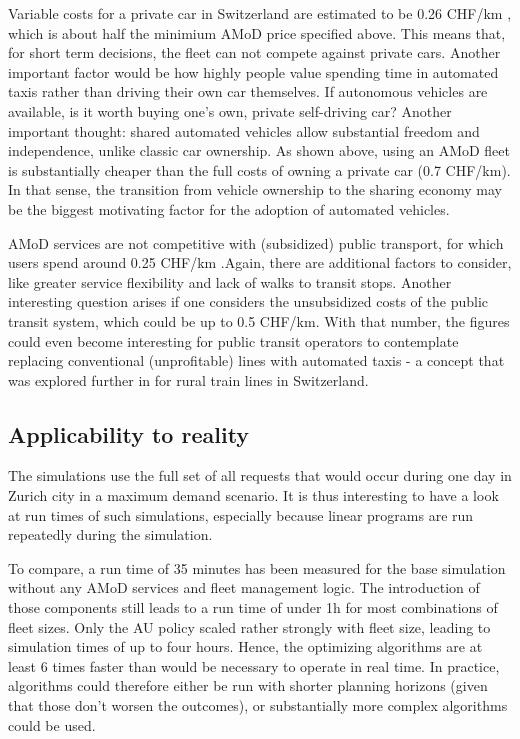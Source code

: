 Variable costs for a private car in Switzerland are estimated to be 0.26 CHF/km \citep{TCS2016}, which is about half the minimium AMoD price specified above. This means that, for short term decisions, the fleet can not compete against private cars. Another important factor would be how highly people value spending time in automated taxis rather than driving their own car themselves. If autonomous vehicles are available, is it worth buying one’s own, private self-driving car? Another important thought: shared automated vehicles allow substantial freedom and independence, unlike classic car ownership. As shown above, using an AMoD fleet is substantially cheaper than the full costs of owning a private car (0.7 CHF/km). In that sense, the transition from vehicle ownership to the sharing economy may be the biggest motivating factor for the adoption of automated vehicles.


AMoD services are not competitive with (subsidized) public transport, for which users spend around 0.25 CHF/km  \citep{Bosch2016a}.Again, there are additional factors to consider, like greater service flexibility and lack of walks to transit stops. Another interesting question arises if one considers the unsubsidized costs of the public transit system, which could be up to 0.5 CHF/km. With that number, the figures could even become interesting for public transit operators to contemplate replacing conventional (unprofitable) lines with automated taxis - a concept that was explored further in  \cite{trainPaper} for rural train lines in Switzerland.

\subsection{Applicability to reality} 

The simulations use the full set of all requests that would occur during one day in Zurich city in a maximum demand scenario. It is thus interesting to have a look at run times of such simulations, especially because linear programs are run repeatedly during the simulation.


To compare, a run time of 35 minutes has been measured for the base simulation without any AMoD services and fleet management logic. The introduction of those components still leads to a run time of under 1h for most combinations of fleet sizes. Only the AU policy scaled rather strongly with fleet size, leading to simulation times of up to four hours. Hence, the optimizing algorithms are at least 6 times faster than would be necessary to operate in real time. In practice, algorithms could therefore either be run with shorter planning horizons (given that those don’t worsen the outcomes), or substantially more complex algorithms could be used.